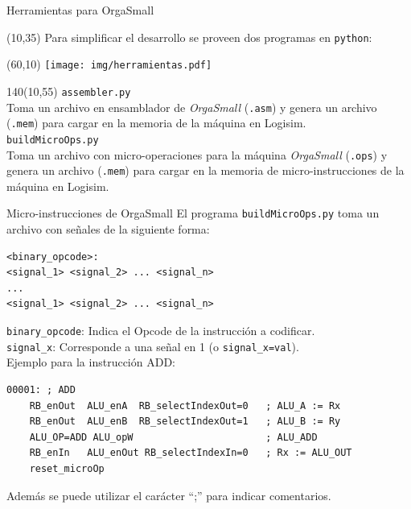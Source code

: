 \documentclass[aspectratio=169]{beamer}
\begin{document}
\begin{frame}[fragile,t]{Herramientas para OrgaSmall}
    \begin{textblock}{40}(10,35)
    Para simplificar el desarrollo se proveen dos programas en \texttt{python}:\\
    \end{textblock}
    \begin{textblock}{50}(60,10)
    \texttt{[image: img/herramientas.pdf]}
    \end{textblock}
    \begin{textblock}{140}(10,55)
    \textcolor{naranjauca}{\texttt{assembler.py}}\\
    Toma un archivo en ensamblador de \emph{OrgaSmall} (\texttt{.asm}) y genera un archivo (\texttt{.mem}) para cargar en la memoria de la máquina en Logisim.\\
    \textcolor{naranjauca}{\texttt{buildMicroOps.py}}\\
    Toma un archivo con micro-operaciones para la máquina \emph{OrgaSmall} (\texttt{.ops}) y genera un archivo (\texttt{.mem}) para cargar en la memoria de micro-instrucciones de la máquina en Logisim.
    \end{textblock}
\end{frame}

\begin{frame}[fragile,t]{Micro-instrucciones de OrgaSmall}
\small
El programa \texttt{buildMicroOps.py} toma un archivo con señales de la siguiente forma:
\scriptsize
\begin{verbatim}
<binary_opcode>:
<signal_1> <signal_2> ... <signal_n>
...
<signal_1> <signal_2> ... <signal_n>
\end{verbatim}
\small
\texttt{binary\_opcode}: \textcolor{verdeuca}{Indica el Opcode de la instrucción a codificar.}\\
\texttt{signal\_x}: \textcolor{verdeuca}{Corresponde a una señal en 1 (o \texttt{signal\_x=val}).}\\
\bigskip
Ejemplo para la instrucción ADD:
\scriptsize
    \begin{verbatim}
00001: ; ADD
    RB_enOut  ALU_enA  RB_selectIndexOut=0   ; ALU_A := Rx
    RB_enOut  ALU_enB  RB_selectIndexOut=1   ; ALU_B := Ry
    ALU_OP=ADD ALU_opW                       ; ALU_ADD
    RB_enIn   ALU_enOut RB_selectIndexIn=0   ; Rx := ALU_OUT
    reset_microOp
\end{verbatim}
\small
Además se puede utilizar el carácter ``;'' para indicar comentarios.
\end{frame}
\end{document}
